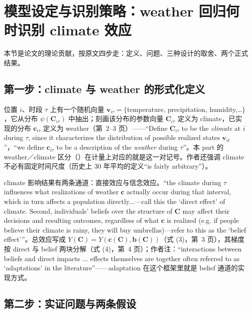 \section{模型设定与识别策略：weather 回归何时识别 climate 效应}

本节是论文的理论贡献，按原文四步走：定义、问题、三种设计的取舍、两个正式结果。

\subsection{第一步：climate 与 weather 的形式化定义}

位置 $i$、时段 $\tau$ 上有一个随机向量 $\mathbf{v}_{i\tau} = \{$temperature, precipitation, humidity,\dots$\}$，它从分布 $\psi(\mathbf{C}_{i\tau})$ 中抽出；刻画该分布的参数向量 $\mathbf{C}_{i\tau}$ 定义为 climate，已实现的分布 $\mathbf{c}_{i\tau}$ 定义为 weather（第~2--3 页）——``Define $\mathbf{C}_{i\tau}$ to be the \emph{climate} at $i$ during $\tau$, since it characterizes the distribution of possible realized states $\mathbf{v}_{it}$''\citep[第~2 页]{hsiang2016climate}，``we define $\mathbf{c}_{i\tau}$ to be a description of the \emph{weather} during $\tau$''\citep[第~3 页]{hsiang2016climate}。本 part 的 weather／climate 区分（）在计量上对应的就是这一对记号。作者还强调 climate 不必有固定时间尺度（历史上 30 年平均的定义``is fairly arbitrary''\citep[第~3 页]{hsiang2016climate}）。

climate 影响结果有两条通道：直接效应与信念效应。``the climate during $\tau$ influences what realizations of weather $\mathbf{c}$ actually occur during that interval, which in turn affects a population directly...—call this the `direct effect' of climate. Second, individuals' beliefs over the structure of $\mathbf{C}$ may affect their decisions and resulting outcomes, regardless of what $\mathbf{c}$ is realized (e.g. if people believe their climate is rainy, they will buy umbrellas)—refer to this as the `belief effect'''\citep[第~3 页]{hsiang2016climate}。总效应写成 $Y(\mathbf{C}) = Y(\mathbf{c}(\mathbf{C}), \mathbf{b}(\mathbf{C}))$（式 (3)，第~3 页），其梯度按 direct 与 belief 两块分解（式 (4)，第~4 页）；作者注：``interactions between beliefs and direct impacts ... effects themselves are together often referred to as `adaptations' in the literature''\citep[第~4 页]{hsiang2016climate}——adaptation 在这个框架里就是 belief 通道的实现方式。

\subsection{第二步：实证问题与两条假设}

